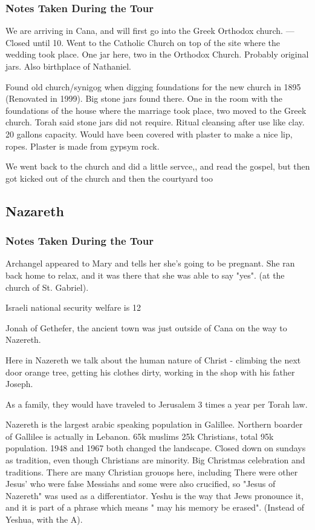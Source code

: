 \documentclass[letterpaper]{report}
\begin{document}
\subsubsection{Notes Taken During the Tour}
We are arriving in Cana, and will first go into the Greek Orthodox church. --- Closed until 10.
Went to the Catholic Church on top of the site where the wedding took place. One jar here, two in the Orthodox Church. Probably original jars. 
Also birthplace of Nathaniel.

Found old church/synigog when digging foundations for the new church in 1895 (Renovated in 1999). Big stone jars found there. One in the room with the foundations of the house where the marriage took place, two moved to the Greek church.
Torah said stone jars did not require. Ritual cleansing after use like clay. 20 gallons capacity. Would have been covered with plaster to make a nice lip, ropes.
Plaster is made from gypsym rock.

We went back to the church and did a little servce,, and read the gospel, but then got kicked out of the church and then the courtyard too

\clearpage
\subsection{Nazareth}
\begin{multicols}{2}
	\mbox{}
\end{multicols}
\subsubsection{Notes Taken During the Tour}
Archangel appeared to Mary and tells her she's going to be pregnant. She ran back home to relax, and it was there that she was able to say "yes". (at the church of St. Gabriel).

Israeli national security welfare is 12%

Jonah of Gethefer, the ancient town was just outside of Cana on the way to Nazereth.

Here in Nazereth we talk about the human nature of Christ - climbing the next door orange tree, getting his clothes dirty, working in the shop with his father Joseph.

As a family, they would have traveled to Jerusalem 3 times a year per Torah law.

Nazereth is the largest arabic speaking population in Galillee.  Northern boarder of Gallilee is actually in Lebanon.  65k muslims 25k Christians, total 95k population. 1948 and 1967 both changed the landscape. Closed down on sundays as tradition, even though Christians are minority.  Big Christmas celebration and traditions.
There are many Christian grouops here, including 
There were other Jesus' who were false Messiahs and some were also crucified, so "Jesus of Nazereth" was used as a differentiator. Yeshu is the way that Jews pronounce it, and it is part of a phrase which means " may his memory be erased".  (Instead of Yeshua, with the A).
\end{document}
